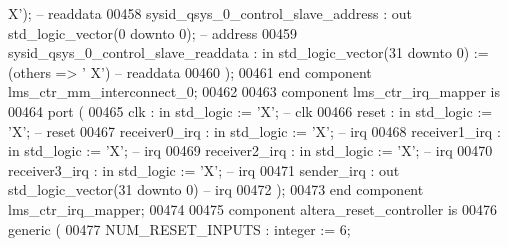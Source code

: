 \begin{DoxyCode}
      X'); \textcolor{keyword}{-- readdata}
00458             sysid\_qsys\_0\_control\_slave\_address          : \textcolor{keywordflow}{out} \textcolor{comment}{std\_logic\_vector}(\textcolor{vhdllogic}{}\textcolor{vhdllogic}{0} \textcolor{keywordflow}{downto} \textcolor{vhdllogic}{}\textcolor{vhdllogic}{0});                
           \textcolor{keyword}{-- address}
00459             sysid\_qsys\_0\_control\_slave\_readdata         : \textcolor{keywordflow}{in}  \textcolor{comment}{std\_logic\_vector}(\textcolor{vhdllogic}{}\textcolor{vhdllogic}{31} \textcolor{keywordflow}{downto} \textcolor{vhdllogic}{}\textcolor{vhdllogic}{0}) := (\textcolor{keywordflow}{others} => '
      X')\textcolor{keyword}{  -- readdata}
00460         );
00461     \textcolor{keywordflow}{end} \textcolor{keywordflow}{component} \textcolor{vhdlchar}{lms_ctr_mm_interconnect_0};
00462 
00463     \textcolor{keywordflow}{component} lms\_ctr\_irq\_mapper \textcolor{keywordflow}{is}
00464         \textcolor{keywordflow}{port} (
00465             clk           : \textcolor{keywordflow}{in}  \textcolor{comment}{std\_logic}                     := 'X'; \textcolor{keyword}{-- clk}
00466             reset         : \textcolor{keywordflow}{in}  \textcolor{comment}{std\_logic}                     := 'X'; \textcolor{keyword}{-- reset}
00467             receiver0\_irq : \textcolor{keywordflow}{in}  \textcolor{comment}{std\_logic}                     := 'X'; \textcolor{keyword}{-- irq}
00468             receiver1\_irq : \textcolor{keywordflow}{in}  \textcolor{comment}{std\_logic}                     := 'X'; \textcolor{keyword}{-- irq}
00469             receiver2\_irq : \textcolor{keywordflow}{in}  \textcolor{comment}{std\_logic}                     := 'X'; \textcolor{keyword}{-- irq}
00470             receiver3\_irq : \textcolor{keywordflow}{in}  \textcolor{comment}{std\_logic}                     := 'X'; \textcolor{keyword}{-- irq}
00471             sender\_irq    : \textcolor{keywordflow}{out} \textcolor{comment}{std\_logic\_vector}(\textcolor{vhdllogic}{}\textcolor{vhdllogic}{31} \textcolor{keywordflow}{downto} \textcolor{vhdllogic}{}\textcolor{vhdllogic}{0})\textcolor{keyword}{         -- irq}
00472         );
00473     \textcolor{keywordflow}{end} \textcolor{keywordflow}{component} \textcolor{vhdlchar}{lms_ctr_irq_mapper};
00474 
00475     \textcolor{keywordflow}{component} altera\_reset\_controller \textcolor{keywordflow}{is}
00476         \textcolor{keywordflow}{generic} (
00477             NUM\_RESET\_INPUTS          : \textcolor{comment}{integer} := \textcolor{vhdllogic}{}\textcolor{vhdllogic}{6};

\end{DoxyCode}
